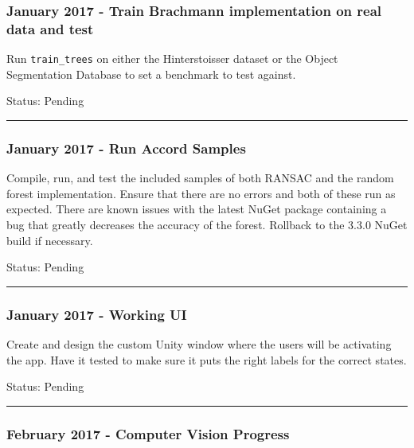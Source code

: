 \documentclass[12pt]{article}
\begin{document}
\subsubsection{January 2017 - Train Brachmann implementation on real
data and
test}\label{january-2017---train-brachmann-implementation-on-real-data-and-test}

Run \texttt{train\_trees} on either the Hinterstoisser dataset or the
Object Segmentation Database to set a benchmark to test against.

Status: Pending

\begin{center}\rule{0.5\linewidth}{\linethickness}\end{center}

\subsubsection{January 2017 - Run Accord
Samples}\label{january-2017---run-accord-samples}

Compile, run, and test the included samples of both RANSAC and the
random forest implementation. Ensure that there are no errors and both
of these run as expected. There are known issues with the latest NuGet
package containing a bug that greatly decreases the accuracy of the
forest. Rollback to the 3.3.0 NuGet build if necessary.

Status: Pending

\begin{center}\rule{0.5\linewidth}{\linethickness}\end{center}

\subsubsection{January 2017 - Working
UI}\label{january-2017---working-ui}

Create and design the custom Unity window where the users will be
activating the app. Have it tested to make sure it puts the right labels
for the correct states.

Status: Pending

\begin{center}\rule{0.5\linewidth}{\linethickness}\end{center}

\subsubsection{February 2017 - Computer Vision
Progress}\label{february-2017---computer-vision-progress}
\end{document}
